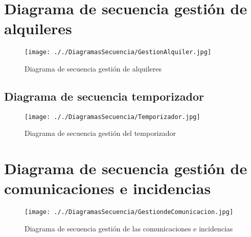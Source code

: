 \documentclass[11pt,spanish]{article} %
\begin{document}
\section{Diagrama de secuencia gestión de alquileres}
\begin{figure}[H]
	\centering
	\label{GestionAlquileres}
	\texttt{[image: ././DiagramasSecuencia/GestionAlquiler.jpg]}
	\caption{Diagrama de secuencia gestión de alquileres}
\end{figure}

\subsection{Diagrama de secuencia temporizador}
\begin{figure}[H]
	\centering
	\label{GestionTemporizador}
	\texttt{[image: ././DiagramasSecuencia/Temporizador.jpg]}
	\caption{Diagrama de secuencia gestión del temporizador}
\end{figure}

\section{Diagrama de secuencia gestión de comunicaciones e incidencias}
\begin{figure}[H]
	\centering
	\label{GestionComunicacionesIncidencias}
	\texttt{[image: ././DiagramasSecuencia/GestiondeComunicacion.jpg]}
	\caption{Diagrama de secuencia gestión de las comunicaciones e incidencias}
\end{figure}
\end{document}
